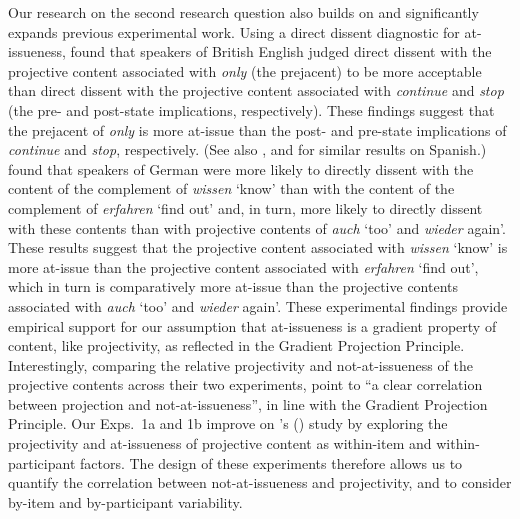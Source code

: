 \documentclass[11pt,fleqn]{article}
\newcommand{\6}{\mbox{$[\hspace*{-.6mm}[$}}
\newcommand{\9}{\mbox{$]\hspace*{-.6mm}]$}}
\newcommand{\citetpos}[1]{\citeauthor{#1}'s (\citeyear{#1})}
\begin{document}
Our research on the second research question also builds on and significantly expands previous experimental work. 
 Using a direct dissent diagnostic for at-issueness, \citet{amaral-etal11} found that speakers of British English judged direct dissent with the projective content associated with {\em only} (the prejacent) to be more acceptable than direct dissent with the projective content associated with {\em continue} and {\em stop} (the pre- and post-state implications, respectively). These findings suggest that the prejacent of {\em only} is more at-issue than the post- and pre-state implications of {\em continue} and {\em stop}, respectively. (See also \citealt{cummins-etal2012}, and \citealt{amaral-cummins2015} for similar results on Spanish.) \citet{xue-onea11} found that speakers of German were more likely to directly dissent with the content of the complement of {\em wissen} `know' than with the content of the complement of {\em erfahren} `find out' and, in turn, more likely to directly dissent with these contents than with projective contents of {\em auch} `too' and {\em wieder} again'. These results suggest that the projective content associated with {\em wissen} `know' is more at-issue than the projective content associated with {\em erfahren} `find out', which in turn is comparatively more at-issue than the projective contents associated with {\em auch} `too' and {\em wieder} again'. These experimental findings provide empirical support for our assumption that at-issueness is a gradient property of content, like projectivity, as reflected in the Gradient Projection Principle.  Interestingly, comparing the relative projectivity and not-at-issueness 
of the projective contents across their two experiments, \citet[180]{xue-onea11} point to ``a clear correlation between projection and not-at-issueness'', in line with the Gradient Projection Principle. Our Exps.~1a and 1b improve on \citetpos{xue-onea11} study by exploring the projectivity and at-issueness of projective content as within-item and within-participant factors. The design of these experiments therefore allows us to quantify the correlation between not-at-issueness and projectivity, and to consider by-item and by-participant variability. 
\end{document}
